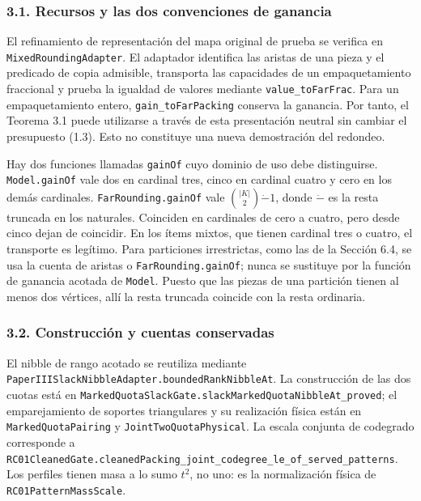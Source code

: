 \documentclass[spanish,11pt,a4paper]{article}
\begin{document}
\subsubsection{3.1. Recursos y las dos convenciones de
ganancia}\label{recursos-y-las-dos-convenciones-de-ganancia}

El refinamiento de representación del mapa original de prueba se
verifica en \nolinkurl{MixedRoundingAdapter}. El adaptador identifica las
aristas de una pieza y el predicado de copia admisible, transporta las
capacidades de un empaquetamiento fraccional y prueba la igualdad de
valores mediante \nolinkurl{value_toFarFrac}. Para un empaquetamiento
entero, \nolinkurl{gain_toFarPacking} conserva la ganancia. Por tanto, el
Teorema 3.1 puede utilizarse a través de esta presentación neutral sin
cambiar el presupuesto (1.3). Esto no constituye una nueva demostración
del redondeo.

Hay dos funciones llamadas \nolinkurl{gainOf} cuyo dominio de uso debe
distinguirse. \nolinkurl{Model.gainOf} vale dos en cardinal tres, cinco en
cardinal cuatro y cero en los demás cardinales.
\nolinkurl{FarRounding.gainOf} vale \(\binom{|K|}{2}\mathbin{\dot-}1\),
donde \(\dot-\) es la resta truncada en los naturales. Coinciden en
cardinales de cero a cuatro, pero desde cinco dejan de coincidir. En los
ítems mixtos, que tienen cardinal tres o cuatro, el transporte es
legítimo. Para particiones irrestrictas, como las de la Sección 6.4, se
usa la cuenta de aristas o \nolinkurl{FarRounding.gainOf}; nunca se
sustituye por la función de ganancia acotada de \nolinkurl{Model}. Puesto
que las piezas de una partición tienen al menos dos vértices, allí la
resta truncada coincide con la resta ordinaria.

\subsubsection{3.2. Construcción y cuentas
conservadas}\label{construcciuxf3n-y-cuentas-conservadas}

El nibble de rango acotado se reutiliza mediante
\nolinkurl{PaperIIISlackNibbleAdapter.boundedRankNibbleAt}. La construcción
de las dos cuotas está en
\nolinkurl{MarkedQuotaSlackGate.slackMarkedQuotaNibbleAt_proved}; el
emparejamiento de soportes triangulares y su realización física están en
\nolinkurl{MarkedQuotaPairing} y \nolinkurl{JointTwoQuotaPhysical}. La escala
conjunta de codegrado corresponde a
\nolinkurl{RC01CleanedGate.cleanedPacking_joint_codegree_le_of_served_patterns}.
Los perfiles tienen masa a lo sumo \(t^2\), no uno: es la normalización
física de \nolinkurl{RC01PatternMassScale}.
\end{document}
